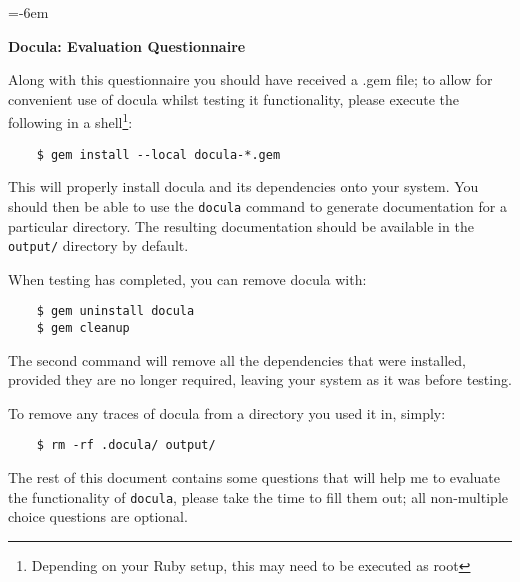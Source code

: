 

\def\LayoutTextField#1#2{\makebox[6em][l]{#1}\raisebox{-.5ex}{#2}}
\def\LayoutChoiceField#1#2{\makebox[6em][l]{#1}#2}
\newdimen\longline
\longline=\textwidth\advance\longline-6em

\makeatletter
{}
\makeatother
\def\DefaultOptionsofRadio{print}

  \begin{center}
    \bf Docula: Evaluation Questionnaire
  \end{center}
  Along with this questionnaire you should have received a .gem file; to allow
  for convenient use of docula whilst testing it functionality, please execute
  the following in a shell\footnote{Depending on your Ruby setup, this may need
  to be executed as root}:
  \begin{verbatim}
    $ gem install --local docula-*.gem
  \end{verbatim}
  This will properly install docula and its dependencies onto your system. You
  should then be able to use the \verb|docula| command to generate documentation
  for a particular directory. The resulting documentation should be available in
  the \verb|output/| directory by default.

  When testing has completed, you can remove docula with:
  \begin{verbatim}
    $ gem uninstall docula
    $ gem cleanup
  \end{verbatim}
  The second command will remove all the dependencies that were installed,
  provided they are no longer required, leaving your system as it was before
  testing.

  To remove any traces of docula from a directory you used it in, simply:
  \begin{verbatim}
    $ rm -rf .docula/ output/
  \end{verbatim}

  The rest of this document contains some questions that will help me to
  evaluate the functionality of \verb|docula|, please take the time to fill them
  out; all non-multiple choice questions are optional.

  \newpage

